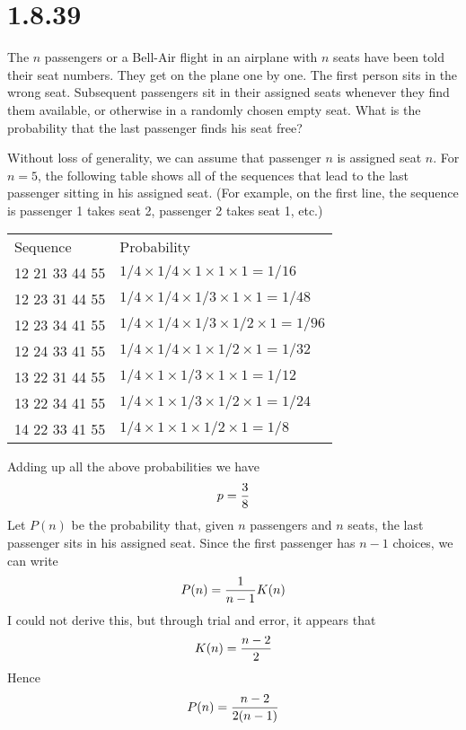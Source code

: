 \section*{1.8.39}
The $n$ passengers or a Bell-Air flight in an airplane with $n$
seats have been told their seat numbers.
They get on the plane one by one.
The first person sits in the wrong seat.
Subsequent passengers sit in their assigned seats whenever they find
them available, or otherwise in a randomly chosen empty seat.
What is the probability that the last passenger finds his seat free?

\bigskip
\noindent
Without loss of generality, we can assume that passenger $n$ is
assigned seat $n$.
For $n=5$, the following table shows all of the sequences that lead
to the last
passenger sitting in his assigned seat.
(For example, on the first line, the sequence is
passenger 1 takes seat 2, passenger 2 takes seat 1, etc.)

\bigskip
\noindent
\begin{tabular}{ll}
Sequence & Probability \\
12 21 33 44 55 & $1/4\times1/4\times1\times1\times1=1/16$ \\
12 23 31 44 55 & $1/4\times1/4\times1/3\times1\times1=1/48$ \\
12 23 34 41 55 & $1/4\times1/4\times1/3\times1/2\times1=1/96$ \\
12 24 33 41 55 & $1/4\times1/4\times1\times1/2\times1=1/32$ \\
13 22 31 44 55 & $1/4\times1\times1/3\times1\times1=1/12$ \\
13 22 34 41 55 & $1/4\times1\times1/3\times1/2\times1=1/24$ \\
14 22 33 41 55 & $1/4\times1\times1\times1/2\times1=1/8$
\end{tabular}

\bigskip
\noindent
Adding up all the above probabilities we have
$$p={3\over8}$$
Let $P(n)$ be the probability that, given $n$ passengers and
$n$ seats, the last passenger sits in his assigned seat.
Since the first passenger has $n-1$ choices, we can write
$$P(n)={1\over n-1}K(n)$$
I could not derive this, but through trial and error, it appears that
$$K(n)={n-2\over2}$$
Hence
$$P(n)={n-2\over 2(n-1)}$$

